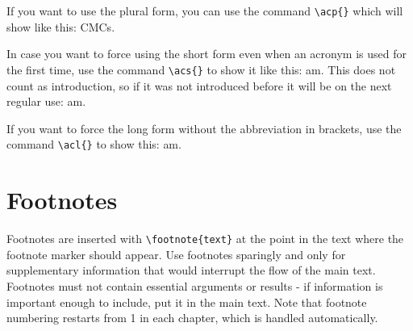 {    If you want to use the plural form, you can use the command \verb|\acp{}| which will show like this: \acp{CMC}.

    In case you want to force using the short form even when an acronym is used for the first time, use the command \verb|\acs{}| to show it like this: \acs{am}. This does not count as introduction, so if it was not introduced before it will be on the next regular use: \ac{am}.

    If you want to force the long form without the abbreviation in brackets, use the command \verb|\acl{}| to show this: \acl{am}.

    \section*{Footnotes}
    Footnotes are inserted with \verb|\footnote{text}| at the point in the text where the footnote marker should appear.
    Use footnotes sparingly and only for supplementary information that would interrupt the flow of the main text.
    Footnotes must not contain essential arguments or results - if information is important enough to include, put it in the main text.
    Note that footnote numbering restarts from 1 in each chapter, which is handled automatically.

}